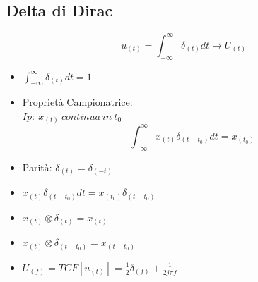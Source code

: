     \subsection{Delta di Dirac}
        \[
            u_{(t)} = \int_{-\infty}^{\infty} \delta_{(t)} dt \rightarrow U_{(t)}
        \]
        \begin{itemize}
            \item {
                $\int_{-\infty}^{\infty} \delta_{(t)} dt = 1$
            }
            \item {
                Proprietà Campionatrice:\\
                $Ip:\ x_{(t)}\ continua\ in\ t_0$
                \[
                    \int_{-\infty}^{\infty}x_{(t)}\delta_{(t-t_0)} dt = x_{(t_0)}  
                \]
            }
            \item {
                Parità: $\delta_{(t)} = \delta_{(-t)}$
            }
            \item {
                $x_{(t)}\delta_{(t-t_0)} dt = x_{(t_0)}\delta_{(t-t_0)}$
            }
            \item {
                $x_{(t)} \otimes \delta_{(t)} = x_{(t)}$
            }
            \item {
                $x_{(t)} \otimes \delta_{(t-t_0)} = x_{(t-t_0)}$
            }
            \item {
                $U_{(f)} = TCF[u_{(t)}] = \frac{1}{2}\delta_{(f)}+\frac{1}{2j\pi f}$
            }
        \end{itemize}
